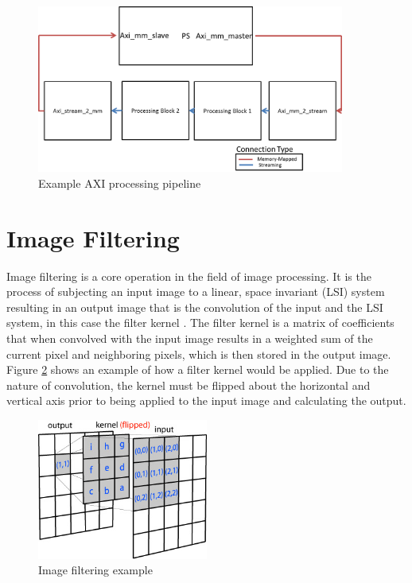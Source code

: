 \begin{figure}[!h]
  \centering
  \includegraphics[width=0.9\textwidth]{./img/axi_pipeline.png}
  \caption{Example AXI processing pipeline}
  \label{fig:axi_pipeline}
\end{figure}

\section{Image Filtering}
Image filtering is a core operation in the field of image processing.  It is the process of subjecting an input image to a linear, space invariant (LSI) system resulting in an output image that is the convolution of the input and the LSI system, in this case the filter kernel \cite{jain1995machine}.  The filter kernel is a matrix of coefficients that when convolved with the input image results in a weighted sum of the current pixel and neighboring pixels, which is then stored in the output image.  Figure \ref{fig:filter_example} shows an example of how a filter kernel would be applied.  Due to the nature of convolution, the kernel must be flipped about the horizontal and vertical axis prior to being applied to the input image and calculating the output.
\begin{figure}[!h]
  \centering
  \includegraphics[width = 0.5\textwidth]{./img/filter_example.jpg}
  \caption{Image filtering example}
  \label{fig:filter_example}
\end{figure}

